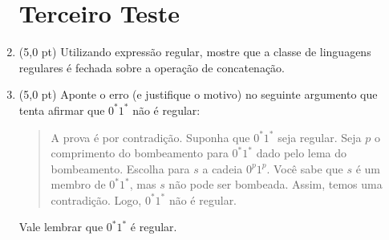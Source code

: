 \documentclass[12pt,a4paper,oneside]{article}
\begin{document}
\begin{enumerate}
	
	\section*{Terceiro Teste}
	
	\item (5,0 pt) Utilizando expressão regular, mostre que a classe de linguagens regulares é fechada sobre a operação de concatenação.
	
	\item (5,0 pt) Aponte o erro (e justifique o motivo) no seguinte argumento que tenta afirmar que $0^*1^*$ não é regular:
	\begin{quote}
		A prova é por contradição. Suponha que $0^*1^*$ seja regular. Seja $p$ o comprimento do bombeamento para $0^*1^*$ dado pelo lema do bombeamento. Escolha para $s$ a cadeia $0^p1^p$. Você sabe que $s$ é um membro de $0^*1^*$, mas $s$ não pode ser bombeada. Assim, temos uma contradição. Logo, $0^*1^*$ não é regular.
	\end{quote}
	Vale lembrar que $0^*1^*$ é regular.
	
\end{enumerate}
\end{document}
